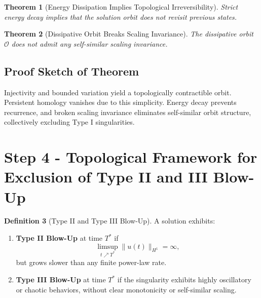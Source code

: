 \documentclass[11pt]{article}
\newtheorem{theorem}{Theorem}[section]
\theoremstyle{definition}
\newtheorem{definition}[theorem]{Definition}
\begin{document}
\begin{theorem}[Energy Dissipation Implies Topological Irreversibility]
Strict energy decay implies that the solution orbit does not revisit previous states.
\end{theorem}

\begin{theorem}[Dissipative Orbit Breaks Scaling Invariance]
The dissipative orbit $\mathcal{O}$ does not admit any self-similar scaling invariance.
\end{theorem}

\subsection*{Proof Sketch of Theorem}
Injectivity and bounded variation yield a topologically contractible orbit. Persistent homology vanishes due to this simplicity. Energy decay prevents recurrence, and broken scaling invariance eliminates self-similar orbit structure, collectively excluding Type I singularities.


\section{Step 4 - Topological Framework for Exclusion of Type II and III Blow-Up}
\label{sec:step4}

\begin{definition}[Type II and Type III Blow-Up]
A solution exhibits:
\begin{enumerate}
  \item \textbf{Type II Blow-Up} at time $T^*$ if
  \[
  \limsup_{t \nearrow T^*} \|u(t)\|_{H^1} = \infty,
  \]
  but grows slower than any finite power-law rate.

  \item \textbf{Type III Blow-Up} at time $T^*$ if the singularity exhibits highly oscillatory or chaotic behaviors, without clear monotonicity or self-similar scaling.
\end{enumerate}
\end{definition}
\end{document}

